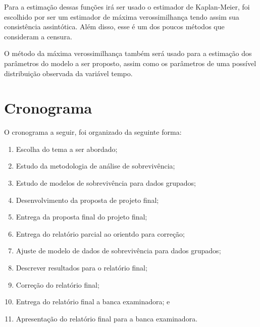 \documentclass[a4paper,12pt]{article}
\begin{document}
Para a estimação dessas funções irá ser usado o estimador de Kaplan-Meier, foi escolhido por ser um estimador de máxima verossimilhança tendo assim sua consistência assintótica. Além disso, esse é um dos poucos métodos que consideram a censura.

O método da máxima verossimilhança também será usado para a estimação dos parâmetros do modelo a ser proposto, assim como os parâmetros de uma possível distribuição observada da variável tempo.

	
\section{Cronograma}

O cronograma a seguir, foi organizado da seguinte forma:

\begin{enumerate}
	\item Escolha do tema a ser abordado;
	\item Estudo da metodologia de análise de sobrevivência;
	\item Estudo de modelos de sobrevivência para dados grupados;
	\item Desenvolvimento da proposta de projeto final;	
	\item Entrega da proposta final do projeto final;
	\item Entrega do relatório parcial ao orientdo para correção;
	\item Ajuste de modelo de dados de sobrevivência para dados grupados;
	\item Descrever resultados para o relatório final;
	\item Correção do relatório final;
	\item Entrega do relatório final a banca examinadora; e
	\item Apresentação do relatório final para a banca examinadora.
\end{enumerate}
		
\end{document}

